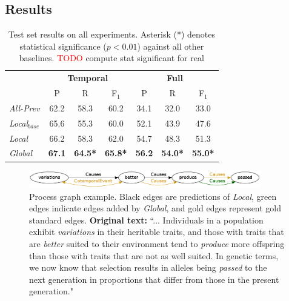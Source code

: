 \subsection{Results} \label{subsec:results}

\begin{table}[t]
{\footnotesize
\begin{tabular}{| l | c | c | c | c | c | c |}
\hline
    & \multicolumn{3}{c|}{\textbf{Temporal}} & \multicolumn{3}{c|}{\textbf{Full}} \\
    & P & R & F$_1$ & P & R & F$_1$ \\
\hline
\hline
\emph{All-Prev} & 62.2 & 58.3 & 60.2 & 34.1 & 32.0 & 33.0 \\
\emph{Local$_{base}$} & 65.6 & 55.3 & 60.0 &  52.1 & 43.9 & 47.6\\
\emph{Local} & 66.2 & 58.3 & 62.0 & 54.7 & 48.3 & 51.3 \\
\emph{Global} & \textbf{67.1} & \textbf{64.5*} & \textbf{65.8*} & \textbf{56.2} & \textbf{54.0*} & \textbf{55.0*} \\
\hline
\end{tabular}}
\caption{Test set results on all experiments. Asterisk (*) denotes statistical significance ($p<0.01$) against all other baselines. \textcolor{red}{TODO} compute stat significant for real}
\label{tab:results}
\end{table}


\begin{figure}[t]
\centering
\includegraphics[width=0.9\textwidth]{figures/p144.png} 
\caption{Process graph example. Black edges are predictions of \emph{Local}, green edges indicate edges added by \emph{Global}, and gold edges represent gold standard edges. \textbf{Original text:} ``... Individuals in a population exhibit \emph{variations} in their heritable traits, and those with traits that are \emph{better} suited to their environment tend to \emph{produce} more offspring than those with traits that are not as well suited. In genetic terms, we now know that selection results in alleles being \emph{passed} to the next generation in proportions that differ from those in the present generation."}
\label{fig:graph}
\end{figure}

